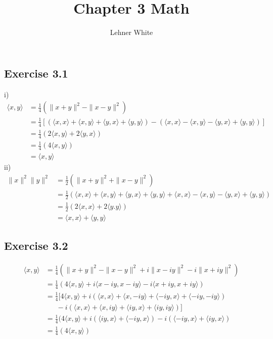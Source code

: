 \documentclass[letterpaper,12pt]{article}
\title{Chapter 3 Math}
\author{Lehner White}
\theoremstyle{definition}
\begin{document}
\maketitle

\subsection*{Exercise 3.1}
i)
\begin{align*}
\langle x,y\rangle  &= \frac{1}{4}(\|x+y\|^{2} - \|x-y\|^{2}) \\
&= \frac{1}{4}[(\langle x,x\rangle  + \langle x,y\rangle  + \langle y,x\rangle  + \langle y,y\rangle ) - (\langle x,x\rangle  - \langle x,y\rangle  - \langle y,x\rangle  + \langle y,y\rangle )] \\
&= \frac{1}{4}(2\langle x,y\rangle  + 2\langle y,x\rangle ) \\
&= \frac{1}{4}(4\langle x,y\rangle ) \\
&= \langle x,y\rangle 
\end{align*}
ii)
\begin{align*}
\|x\|^{2}\|y\|^{2} &= \frac{1}{2}(\|x+y\|^{2} + \|x-y\|^{2}) \\
&= \frac{1}{2}(\langle x,x\rangle  + \langle x,y\rangle  + \langle y,x\rangle  + \langle y,y\rangle + \langle x,x\rangle  - \langle x,y\rangle  - \langle y,x\rangle  + \langle y,y\rangle ) \\
&= \frac{1}{2}(2\langle x,x\rangle  + 2\langle y.y\rangle ) \\
&= \langle x,x\rangle  + \langle y,y\rangle 
\end{align*}

\subsection*{Exercise 3.2}
\begin{align*}
\langle x,y\rangle  &= \frac{1}{4}(\|x+y\|^{2} - \|x-y\|^{2} + i\|x-iy\|^{2} - i\|x+iy\|^{2}) \\
&= \frac{1}{4}(4\langle x,y\rangle  + i\langle x-iy,x-iy\rangle  - i\langle x+iy,x+iy\rangle ) \\
&= \frac{1}{4}[4\langle x,y\rangle  + i(\langle x,x\rangle  + \langle x,-iy\rangle  + \langle -iy,x\rangle  + \langle -iy,-iy\rangle ) \\
&~~~~~~~ - i(\langle x,x\rangle  + \langle x,iy\rangle  + \langle iy,x\rangle  + \langle iy,iy\rangle )] \\
&= \frac{1}{4}(4\langle x,y\rangle  + i(\langle iy,x\rangle  + \langle -iy,x\rangle ) - i(\langle -iy,x\rangle  + \langle iy,x\rangle ) \\
&= \frac{1}{4}(4\langle x,y\rangle )
\end{align*}
\end{document}
